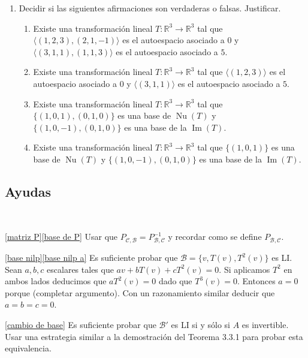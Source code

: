 \begin{enumerate}[resume, topsep=5pt,itemsep=5pt]
    
\item Decidir si las siguientes afirmaciones son verdaderas o falsas. Justificar. 
\begin{enumerate}
    \item\label{tl-V-o-F-a} Existe una transformación lineal $T:\mathbb{R}^3\longrightarrow\mathbb{R}^3$ tal que $\langle(1,2,3),(2,1,-1)\rangle$ es el autoespacio asociado a $0$ y $\langle(3,1,1),(1,1,3)\rangle$ es el autoespacio asociado a $5$.
    \item\label{tl-V-o-F-b} Existe una transformación lineal $T:\mathbb{R}^3\longrightarrow\mathbb{R}^3$ tal que $\langle(1,2,3)\rangle$ es el autoespacio asociado a $0$ y $\langle(3,1,1)\rangle$ es el autoespacio asociado a $5$.
    \item\label{tl-V-o-F-c} Existe una transformación lineal $T:\mathbb{R}^3\longrightarrow\mathbb{R}^3$ tal que $\{(1,0,1), (0,1,0)\}$ es una base de $\operatorname{Nu}(T)$ y  $\{(1,0,-1), (0,1,0)\}$ es una base de la $\operatorname{Im}(T)$.
    \item\label{tl-V-o-F-d} Existe una transformación lineal $T:\mathbb{R}^3\longrightarrow\mathbb{R}^3$ tal que $\{(1,0,1)\}$ es una base de $\operatorname{Nu}(T)$ y  $\{(1,0,-1), (0,1,0)\}$ es una base de la $\operatorname{Im}(T)$. 
\end{enumerate}

\end{enumerate}

\subsection*{Ayudas}

\

\ref{matriz P}\ref{base de P} Usar que $P_{\mathcal{C},\mathcal{B}}=P_{\mathcal{B},\mathcal{C}}^{-1}$ y recordar como se define $P_{\mathcal{B},\mathcal{C}}$.


\ref{base nilp}\ref{base nilp a} Es suficiente probar que $\mathcal{B}=\{v, T(v), T^2(v)\}$ es LI. Sean $a,b,c$ escalares tales que $av+bT(v)+cT^2(v)=0$. Si aplicamos $T^2$ en ambos lados deducimos que $aT^2(v)=0$ dado que $T^3(v)=0$. Entonces $a=0$ porque (completar argumento). Con un razonamiento similar deducir que $a=b=c=0$.


\ref{cambio de base} Es suficiente probar que $\mathcal{B}'$ es LI si y sólo si $A$ es invertible. Usar una estrategia similar a la demostración del Teorema 3.3.1 para probar esta equivalencia.

